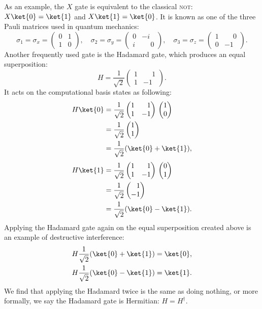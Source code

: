 \documentclass[a4paper,10pt]{article}
\newcommand{\qstatezero}{
	\begin{pmatrix}1 \\ 0\end{pmatrix}
}
\newcommand{\qstateone}{
	\begin{pmatrix}0 \\ 1\end{pmatrix}
}
\newcommand{\hgate}{
	\dfrac{1}{\sqrt2}
	\begin{pmatrix}
		1 & \phantom{-}1 \\
		1 & -1
	\end{pmatrix}
}
\begin{document}
As an example, the $X$ gate is equivalent to the classical \textsc{not}: $X\ket{0} = \ket{1}$ and $X\ket{1} = \ket{0}$.
It is known as one of the three Pauli matrices used in quantum mechanics:
\begin{equation} \label{eq:paulis}
\sigma_1 = \sigma_x =
\begin{pmatrix}
0 & 1 \\
1 & 0
\end{pmatrix},
\quad
\sigma_2 = \sigma_y =
\begin{pmatrix}
0 & -i \\
i & \phantom{-}0
\end{pmatrix},
\quad
\sigma_3 = \sigma_z =
\begin{pmatrix}
1 & \phantom{-}0 \\
0 & -1
\end{pmatrix}.
\end{equation}
Another frequently used gate is the Hadamard gate, which produces an equal superposition:
\begin{equation}
H = \hgate{}.
\end{equation}
It acts on the computational basis states as following:
\begin{equation}
\begin{aligned}
H\ket{0} &=
\hgate{}
\qstatezero{} \\
&=
\dfrac{1}{\sqrt2}
\begin{pmatrix}1 \\ 1\end{pmatrix} \\
&= \dfrac{1}{\sqrt2}(\ket{0} + \ket{1}),
\end{aligned}
\end{equation}
\begin{equation}
\begin{aligned}
H\ket{1} &=
\hgate{}
\qstateone{} \\
&=
\dfrac{1}{\sqrt2}
\begin{pmatrix}\phantom{-}1 \\ -1\end{pmatrix} \\
&= \dfrac{1}{\sqrt2}(\ket{0} - \ket{1}).
\end{aligned}
\end{equation}
Applying the Hadamard gate again on the equal superposition created above is an example of destructive interference:
\begin{align}
H\dfrac{1}{\sqrt2}(\ket{0} + \ket{1}) &= \ket{0}, \\
H\dfrac{1}{\sqrt2}(\ket{0} - \ket{1}) &= \ket{1}.
\end{align}
We find that applying the Hadamard twice is the same as doing nothing, or more formally, we say the Hadamard gate is Hermitian: $H = H^\dagger$.
\end{document}
